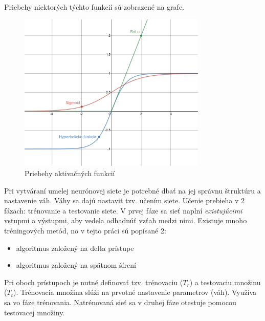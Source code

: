 Priebehy niektorých týchto funkcií sú zobrazené na grafe.
\begin{figure}[H]
    \centering
    \includegraphics[width=0.8\textwidth]{images/activation-functions.png}
    \caption{Priebehy aktivačných funkcií}
\end{figure}\label{figure:activation-functions}

Pri vytváraní umelej neurónovej siete je potrebné dbať na jej správnu štruktúru a nastavenie váh.
Váhy sa dajú nastaviť tzv. učením siete.
Učenie prebieha v 2 fázach: trénovanie a testovanie siete.
V prvej fáze sa sieť naplní \emph{existujúcimi} vstupmi a výstupmi, aby vedela odhadnúť vzťah medzi nimi.
Existuje mnoho tréningových metód, no v tejto práci sú popísané 2:
\begin{itemize}
    \item algoritmus založený na delta prístupe\cite{algo_ann_delta_rule}
    \item algoritmus založený na spätnom šírení\cite{algo_ann_backpropagation}
\end{itemize}
Pri oboch prístupoch je nutné definovať tzv. trénovaciu ($T_r$) a testovaciu množinu ($T_t$).
Trénovacia množina slúži na prvotné nastavenie parametrov (váh).
Využíva sa vo fáze trénovania.
Natrénovaná sieť sa v druhej fáze otestuje pomocou testovacej množiny.

